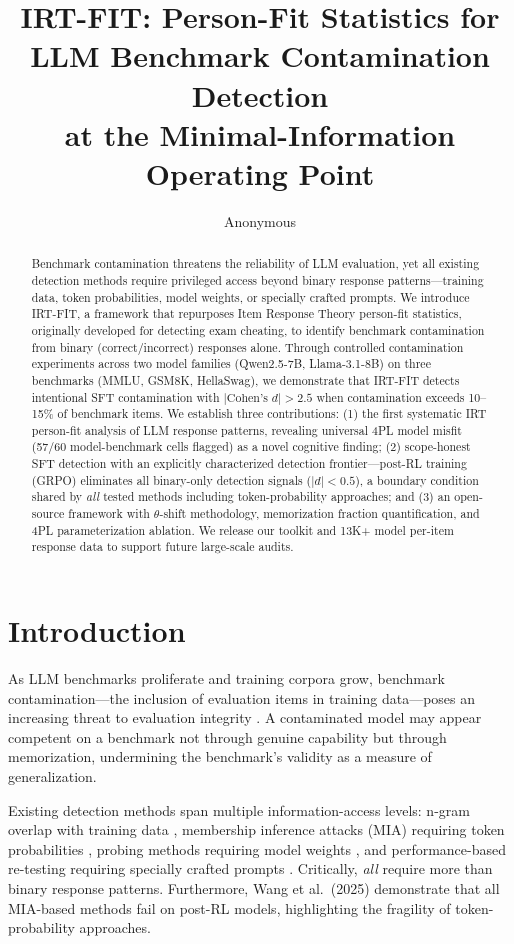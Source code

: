 \documentclass[11pt,a4paper]{article}
\title{IRT-FIT: Person-Fit Statistics for LLM Benchmark Contamination Detection\\at the Minimal-Information Operating Point}
\author{Anonymous}
\begin{document}
\maketitle

\begin{abstract}
Benchmark contamination threatens the reliability of LLM evaluation, yet all existing detection methods require privileged access beyond binary response patterns---training data, token probabilities, model weights, or specially crafted prompts. We introduce IRT-FIT, a framework that repurposes Item Response Theory person-fit statistics, originally developed for detecting exam cheating, to identify benchmark contamination from binary (correct/incorrect) responses alone. Through controlled contamination experiments across two model families (Qwen2.5-7B, Llama-3.1-8B) on three benchmarks (MMLU, GSM8K, HellaSwag), we demonstrate that IRT-FIT detects intentional SFT contamination with $|\text{Cohen's } d| > 2.5$ when contamination exceeds 10--15\% of benchmark items. We establish three contributions: (1) the first systematic IRT person-fit analysis of LLM response patterns, revealing universal 4PL model misfit (57/60 model-benchmark cells flagged) as a novel cognitive finding; (2) scope-honest SFT detection with an explicitly characterized detection frontier---post-RL training (GRPO) eliminates all binary-only detection signals ($|d| < 0.5$), a boundary condition shared by \emph{all} tested methods including token-probability approaches; and (3) an open-source framework with $\theta$-shift methodology, memorization fraction quantification, and 4PL parameterization ablation. We release our toolkit and 13K+ model per-item response data to support future large-scale audits.
\end{abstract}

\section{Introduction}

As LLM benchmarks proliferate and training corpora grow, benchmark contamination---the inclusion of evaluation items in training data---poses an increasing threat to evaluation integrity \cite{sainz2023nlp,li2024task}. A contaminated model may appear competent on a benchmark not through genuine capability but through memorization, undermining the benchmark's validity as a measure of generalization.

Existing detection methods span multiple information-access levels: n-gram overlap with training data \cite{dodge2021documenting}, membership inference attacks (MIA) requiring token probabilities \cite{shi2024detecting}, probing methods requiring model weights \cite{oren2024proving}, and performance-based re-testing requiring specially crafted prompts \cite{golchin2024time,li2024constat}. Critically, \emph{all} require more than binary response patterns. Furthermore, Wang et al.\ (2025) demonstrate that all MIA-based methods fail on post-RL models, highlighting the fragility of token-probability approaches.
\end{document}
